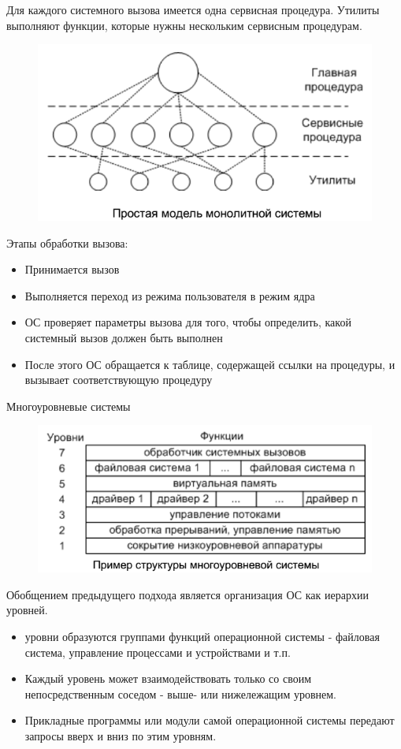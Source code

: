\documentclass{beamer}
\begin{document}
\begin{frame}[t]
Для каждого системного вызова имеется одна сервисная процедура. Утилиты выполняют функции, которые нужны нескольким сервисным процедурам.
\begin{figure}[h]
\centering
\includegraphics[scale=0.4]{images/lec01-pic02.png}
\end{figure}
Этапы обработки вызова:
\begin{itemize}
\item Принимается вызов
\item Выполняется переход из режима пользователя в режим ядра
\item ОС проверяет параметры вызова для того, чтобы определить, какой системный вызов должен быть выполнен
\item После этого ОС обращается к таблице, содержащей ссылки на процедуры, и вызывает соответствующую процедуру
\end{itemize}
\end{frame}

\begin{frame}[t]
Многоуровневые системы
\begin{figure}[h]
\centering
\includegraphics[scale=0.5]{images/lec01-pic03.png}
\end{figure}
Обобщением предыдущего подхода является организация ОС как иерархии уровней. 
\begin{itemize}
\item уровни образуются группами функций операционной системы - файловая система, управление процессами и устройствами и т.п. 
\item Каждый уровень может взаимодействовать только со своим непосредственным соседом - выше- или нижележащим уровнем. 
\item Прикладные программы или модули самой операционной системы передают запросы вверх и вниз по этим уровням.
\end{itemize}
\end{frame}
\end{document}
